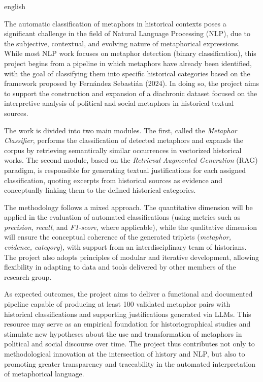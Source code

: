 \cleardoublepage{}
{}
\begin{otherlanguage*}{english}
\begin{resumo}[Abstract]
    The automatic classification of metaphors in historical contexts poses a significant challenge in the field of Natural Language Processing (NLP), due to the subjective, contextual, and evolving nature of metaphorical expressions. While most NLP work focuses on metaphor detection (binary classification), this project begins from a pipeline in which metaphors have already been identified, with the goal of classifying them into specific historical categories based on the framework proposed by Fernández Sebastián (2024). In doing so, the project aims to support the construction and expansion of a diachronic dataset focused on the interpretive analysis of political and social metaphors in historical textual sources.

    The work is divided into two main modules. The first, called the \textit{Metaphor Classifier}, performs the classification of detected metaphors and expands the corpus by retrieving semantically similar occurrences in vectorized historical works. The second module, based on the \textit{Retrieval-Augmented Generation} (RAG) paradigm, is responsible for generating textual justifications for each assigned classification, quoting excerpts from historical sources as evidence and conceptually linking them to the defined historical categories.

    The methodology follows a mixed approach. The quantitative dimension will be applied in the evaluation of automated classifications (using metrics such as \textit{precision}, \textit{recall}, and \textit{F1-score}, where applicable), while the qualitative dimension will ensure the conceptual coherence of the generated triplets (\textit{metaphor, evidence, category}), with support from an interdisciplinary team of historians. The project also adopts principles of modular and iterative development, allowing flexibility in adapting to data and tools delivered by other members of the research group.

    As expected outcomes, the project aims to deliver a functional and documented pipeline capable of producing at least 100 validated metaphor pairs with historical classifications and supporting justifications generated via LLMs. This resource may serve as an empirical foundation for historiographical studies and stimulate new hypotheses about the use and transformation of metaphors in political and social discourse over time. The project thus contributes not only to methodological innovation at the intersection of history and NLP, but also to promoting greater transparency and traceability in the automated interpretation of metaphorical language.

\end{resumo}
\end{otherlanguage*}
